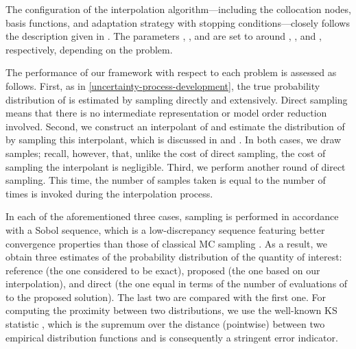 The configuration of the interpolation algorithm---including the collocation
nodes, basis functions, and adaptation strategy with stopping
conditions---closely follows the description given in .
The parameters , , and  are set to around
, , and , respectively, depending on the
problem.

The performance of our framework with respect to each problem is assessed as
follows. First, as in \cref{uncertainty-process-development}, the true
probability distribution of \g is estimated by sampling \g directly and
extensively. Direct sampling means that there is no intermediate representation
or model order reduction involved. Second, we construct an interpolant of \g and
estimate the distribution of \g by sampling this interpolant, which is discussed
in  and . In both cases, we draw
 samples; recall, however, that, unlike the cost of direct
sampling, the cost of sampling the interpolant is negligible. Third, we perform
another round of direct sampling. This time, the number of samples taken is
equal to the number of times \g is invoked during the interpolation process.

In each of the aforementioned three cases, sampling is performed in accordance
with a Sobol sequence, which is a low-discrepancy sequence featuring better
convergence properties than those of classical \ac{MC} sampling \cite{joe2008}.
As a result, we obtain three estimates of the probability distribution of the
quantity of interest: reference (the one considered to be exact), proposed (the
one based on our interpolation), and direct (the one equal in terms of the
number of evaluations of \g to the proposed solution). The last two are compared
with the first one. For computing the proximity between two distributions, we
use the well-known \ac{KS} statistic \cite{rao2002}, which is the supremum over
the distance (pointwise) between two empirical distribution functions and is
consequently a stringent error indicator.

